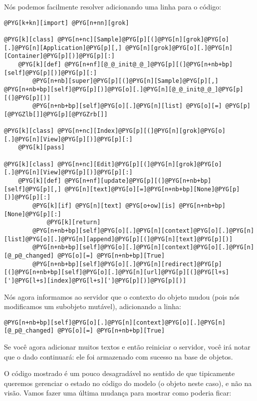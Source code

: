 \documentclass[a4paper,12pt,portuguese]{manual}
\begin{document}
Nós podemos facilmente resolver adicionando uma linha para o código:

\begin{Verbatim}[commandchars=@\[\]]
@PYG[k+kn][import] @PYG[n+nn][grok]

@PYG[k][class] @PYG[n+nc][Sample]@PYG[p][(]@PYG[n][grok]@PYG[o][.]@PYG[n][Application]@PYG[p][,] @PYG[n][grok]@PYG[o][.]@PYG[n][Container]@PYG[p][)]@PYG[p][:]
    @PYG[k][def] @PYG[n+nf][@_@_init@_@_]@PYG[p][(]@PYG[n+nb+bp][self]@PYG[p][)]@PYG[p][:]
        @PYG[n+nb][super]@PYG[p][(]@PYG[n][Sample]@PYG[p][,] @PYG[n+nb+bp][self]@PYG[p][)]@PYG[o][.]@PYG[n][@_@_init@_@_]@PYG[p][(]@PYG[p][)]
        @PYG[n+nb+bp][self]@PYG[o][.]@PYG[n][list] @PYG[o][=] @PYG[p][@PYGZlb[]]@PYG[p][@PYGZrb[]]
    
@PYG[k][class] @PYG[n+nc][Index]@PYG[p][(]@PYG[n][grok]@PYG[o][.]@PYG[n][View]@PYG[p][)]@PYG[p][:]
    @PYG[k][pass]

@PYG[k][class] @PYG[n+nc][Edit]@PYG[p][(]@PYG[n][grok]@PYG[o][.]@PYG[n][View]@PYG[p][)]@PYG[p][:]
    @PYG[k][def] @PYG[n+nf][update]@PYG[p][(]@PYG[n+nb+bp][self]@PYG[p][,] @PYG[n][text]@PYG[o][=]@PYG[n+nb+bp][None]@PYG[p][)]@PYG[p][:]
        @PYG[k][if] @PYG[n][text] @PYG[o+ow][is] @PYG[n+nb+bp][None]@PYG[p][:]
            @PYG[k][return]
        @PYG[n+nb+bp][self]@PYG[o][.]@PYG[n][context]@PYG[o][.]@PYG[n][list]@PYG[o][.]@PYG[n][append]@PYG[p][(]@PYG[n][text]@PYG[p][)]
        @PYG[n+nb+bp][self]@PYG[o][.]@PYG[n][context]@PYG[o][.]@PYG[n][@_p@_changed] @PYG[o][=] @PYG[n+nb+bp][True]
        @PYG[n+nb+bp][self]@PYG[o][.]@PYG[n][redirect]@PYG[p][(]@PYG[n+nb+bp][self]@PYG[o][.]@PYG[n][url]@PYG[p][(]@PYG[l+s][']@PYG[l+s][index]@PYG[l+s][']@PYG[p][)]@PYG[p][)]
\end{Verbatim}

Nós agora informamos ao servidor que o contexto do objeto mudou (pois
nós modificamos um subobjeto mutável), adicionando a linha:

\begin{Verbatim}[commandchars=@\[\]]
@PYG[n+nb+bp][self]@PYG[o][.]@PYG[n][context]@PYG[o][.]@PYG[n][@_p@_changed] @PYG[o][=] @PYG[n+nb+bp][True]
\end{Verbatim}

Se você agora adicionar muitos textos e então reiniciar o servidor, você
irá notar que o dado continuará: ele foi armazenado com sucesso na
base de objetos.

O código mostrado é um pouco desagradável no sentido de que
tipicamente queremos gerenciar o estado no código do modelo (o objeto
 neste caso), e não na visão. Vamos fazer uma última
mudança para mostrar como poderia ficar:
\end{document}
